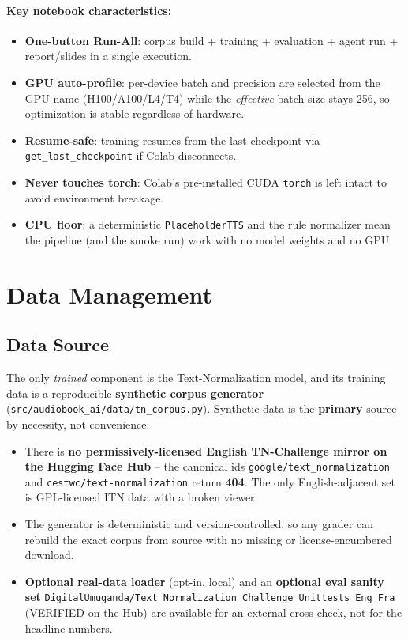 \documentclass[12pt,a4paper]{article}
\begin{document}
\paragraph{Key notebook characteristics:}
\begin{itemize}\setlength\itemsep{0.15em}
  \item \textbf{One-button Run-All}: corpus build + training + evaluation + agent run + report/slides in a single execution.
  \item \textbf{GPU auto-profile}: per-device batch and precision are selected from the GPU name (H100/A100/L4/T4) while the \emph{effective} batch size stays 256, so optimization is stable regardless of hardware.
  \item \textbf{Resume-safe}: training resumes from the last checkpoint via \texttt{get\_last\_checkpoint} if Colab disconnects.
  \item \textbf{Never touches torch}: Colab's pre-installed CUDA \texttt{torch} is left intact to avoid environment breakage.
  \item \textbf{CPU floor}: a deterministic \texttt{PlaceholderTTS} and the rule normalizer mean the pipeline (and the smoke run) work with no model weights and no GPU.
\end{itemize}

\section{Data Management}

\subsection{Data Source}

The only \emph{trained} component is the Text-Normalization model, and its training data is a reproducible \textbf{synthetic corpus generator} (\texttt{src/audiobook\_ai/data/tn\_corpus.py}). Synthetic data is the \textbf{primary} source by necessity, not convenience:

\begin{itemize}\setlength\itemsep{0.15em}
  \item There is \textbf{no permissively-licensed English TN-Challenge mirror on the Hugging Face Hub} -- the canonical ids \texttt{google/text\_normalization} and \texttt{cestwc/text-normalization} return \textbf{404}. The only English-adjacent set is GPL-licensed ITN data with a broken viewer.
  \item The generator is deterministic and version-controlled, so any grader can rebuild the exact corpus from source with no missing or license-encumbered download.
  \item \textbf{Optional real-data loader} (opt-in, local) and an \textbf{optional eval sanity set} \texttt{DigitalUmuganda/Text\_Normalization\_Challenge\_Unittests\_Eng\_Fra} (VERIFIED on the Hub) are available for an external cross-check, not for the headline numbers.
\end{itemize}
\end{document}
